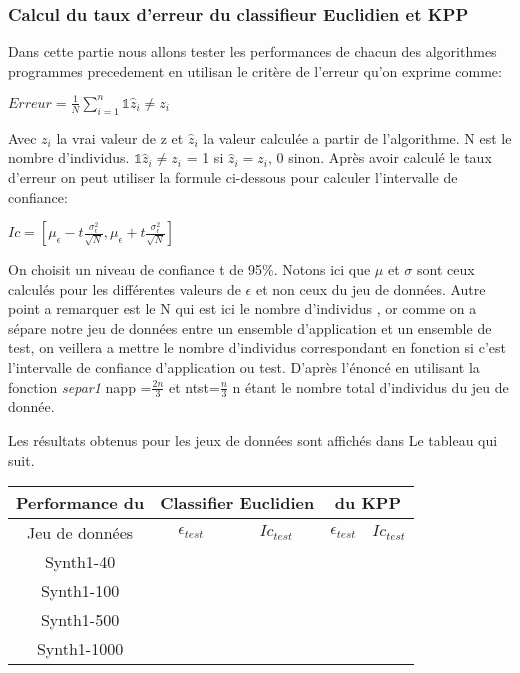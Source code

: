\documentclass[10pt]{article}
\begin{document}
			\subsubsection{Calcul du taux d'erreur du classifieur Euclidien et KPP}
			Dans cette partie nous allons tester les performances de chacun des algorithmes programmes precedement en utilisan le critère de l'erreur qu'on exprime comme:
			\begin{center}
			$Erreur = \frac{1}{N} \sum_{i=1}^{n} {\mathds{1} \hat{z}_{i}  \neq z_{i}}$
			\end{center}
		Avec $z_{i}$ la vrai valeur de z et $\hat{z}_{i}$ la valeur calculée a partir de l'algorithme. N est le nombre d'individus. $\mathds{1} \hat{z}_{i}  \neq z_{i}$ = 1 si $\hat{z}_{i}  = z_{i}$, 0 sinon.
		Après avoir calculé le taux d'erreur on peut utiliser la formule ci-dessous pour calculer l'intervalle de confiance:
		\begin{center}
		$Ic = [\mu_\epsilon - t \frac{\sigma_{\epsilon}^2}{\sqrt{N}}, \mu_\epsilon + t \frac{\sigma_{\epsilon}^2}{\sqrt{N}}]$
		\end{center}
	
		On choisit un niveau de confiance t de 95\%. Notons ici que  $\mu$ et $\sigma$ sont ceux calculés pour les différentes valeurs de $\epsilon$ et non ceux du jeu de données. Autre point a remarquer est le N qui est ici le nombre d'individus , or comme on a sépare notre jeu de données entre un ensemble d'application et un ensemble de test, on veillera a mettre le nombre d'individus correspondant en fonction si c'est l'intervalle de confiance  d'application ou test. D'après l'énoncé en utilisant la fonction \textit{separ1} napp =$\frac{2n}{3}$  et ntst=$\frac{n}{3}$ n étant le nombre total d'individus du jeu de donnée.
			
			Les résultats obtenus pour les jeux de données sont affichés dans Le tableau qui suit.
			\begin{center}		
				\begin{tabular}{ | c | c | c || c | c |}
						\rowcolor{lightgray} 
				   	 Performance du &  \multicolumn{2}{c||}{ Classifier Euclidien}  &  \multicolumn{2}{|c|}{du KPP}\\
					
					\hline
					Jeu de données &  $\epsilon_{test}$ &  $Ic_{test}$  & $\epsilon_{test}$ &  $Ic_{test}$\\
					\hline
					\multirow{1}{*}{Synth1-40}       &           & 		& &			 \\
																
					\hline
					\multirow{1}{*}{Synth1-100}      &                   & 			& &   \\
				
					\hline
					\multirow{1}{*}{Synth1-500}        &                   & 		& &		\\
				
					\hline
					\multirow{1}{*}{Synth1-1000}         &                   & 		& &		\\
				
					\hline
				\end{tabular}
			\end{center}
			
\end{document}
